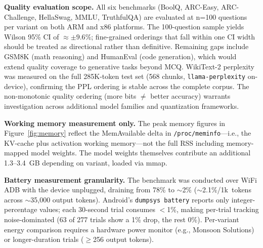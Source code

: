 \documentclass[conference]{IEEEtran}
\begin{document}
\textbf{Quality evaluation scope.} All six benchmarks (BoolQ, ARC-Easy, ARC-Challenge,
HellaSwag, MMLU, TruthfulQA) are evaluated at n=100 questions per variant on both
ARM and x86 platforms. The 100-question sample yields Wilson 95\% CI of
$\approx\pm9.6\%$; fine-grained orderings that fall within one CI width should
be treated as directional rather than definitive.
Remaining gaps include GSM8K (math reasoning) and HumanEval (code generation),
which would extend quality coverage to generative tasks beyond MCQ.
WikiText-2 perplexity was measured on the full 285K-token test set
(568 chunks, \texttt{llama-perplexity} on-device), confirming the
PPL ordering is stable across the complete corpus.
The non-monotonic quality ordering (more bits $\neq$ better accuracy) warrants
investigation across additional model families and quantization frameworks.

\textbf{Working memory measurement only.} The peak memory figures in Figure~\ref{fig:memory}
reflect the MemAvailable delta in \texttt{/proc/meminfo}---i.e., the KV-cache plus
activation working memory---not the full RSS including memory-mapped model weights.
The model weights themselves contribute an additional 1.3--3.4~GB depending on
variant, loaded via mmap.

\textbf{Battery measurement granularity.} The benchmark was conducted over WiFi ADB
with the device unplugged, draining from 78\% to ${\sim}$2\%
(${\sim}$2.1\%/1k~tokens across ${\sim}$35{,}000 output tokens).
Android's \texttt{dumpsys battery} reports only integer-percentage values; each
30-second trial consumes $<$1\%, making per-trial tracking noise-dominated
(63 of 277 trials show a 1\% drop, the rest 0\%). Per-variant energy comparison
requires a hardware power monitor (e.g., Monsoon Solutions) or
longer-duration trials ($\geq$256 output tokens).
\end{document}
